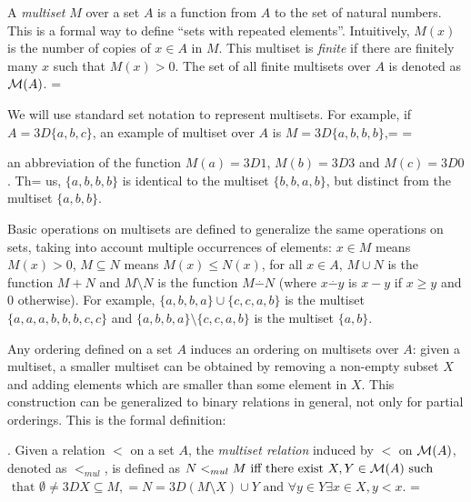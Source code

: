 \documentclass[11pt]{llncs}
\begin{document}
A {\em multiset} $M$ over a set $A$ is a function from $A$ to the set of
natural numbers. This is a formal way to define ``sets with repeated
elements''. Intuitively, $M(x)$ is the number of copies of $x\in A$
in $M$. This multiset is {\em finite} if there are finitely many $x$
such that $M(x)>0$. The set of all finite multisets over $A$ is denoted
as ${\cal M}(A)$. =


We will use standard set notation to represent multisets. For example,
if $A=3D\{a,b,c\}$, an example of multiset over $A$ is $M=3D\{a,b,b,b\}$,=
  =

an abbreviation of the function $M(a)=3D1$, $M(b)=3D3$ and $M(c)=3D0$. Th=
us,
$\{a,b,b,b\}$ is identical to the multiset $\{b,b,a,b\}$, but distinct
from the multiset $\{a,b,b\}$.

Basic operations on multisets are defined to generalize the same
operations on sets, taking into account multiple occurrences
of elements: $x\in M$ means $M(x)>0$, $M\subseteq N$ means $M(x) \leq
N(x)$, for all $x\in A$, $M\cup N$ is the function $M+N$ and $M\setminus
N$ is the function $M\stackrel{.}{-} N$ (where $x\stackrel{.}{-}y$ is
$x-y$ if $x\geq y$ and $0$ otherwise). For example,
$\{a,b,b,a\}\cup\{c,c,a,b\}$ is the multiset $\{a,a,a,b,b,b,c,c\}$ and
$\{a,b,b,a\}\setminus\{c,c,a,b\}$ is the multiset  $\{a,b\}$.

Any ordering defined on a set $A$ induces an ordering on
multisets over $A$: given a multiset, a smaller multiset can be obtained
by removing a non-empty subset $X$ and adding elements which are smaller
than some element in $X$. This construction can be generalized to binary
relations in general, not only for partial orderings. This is the formal
definition:

\vspace{0.1cm}

. Given a relation $<$ on a set $A$, the {\em
multiset relation} induced by $<$ on ${\cal M}(A)$, denoted as
$<_{mul}$, is defined as $N <_{mul} M \mbox{ iff there exist } X,Y\in
{\cal M}(A) \mbox{ such}$ $\mbox{ that } \emptyset \not=3D X \subseteq M,=
 N =3D (M
\setminus X) \cup Y \mbox{ and } \forall y\in Y\exists x \in X, y < x$.
 =
\end{document}

